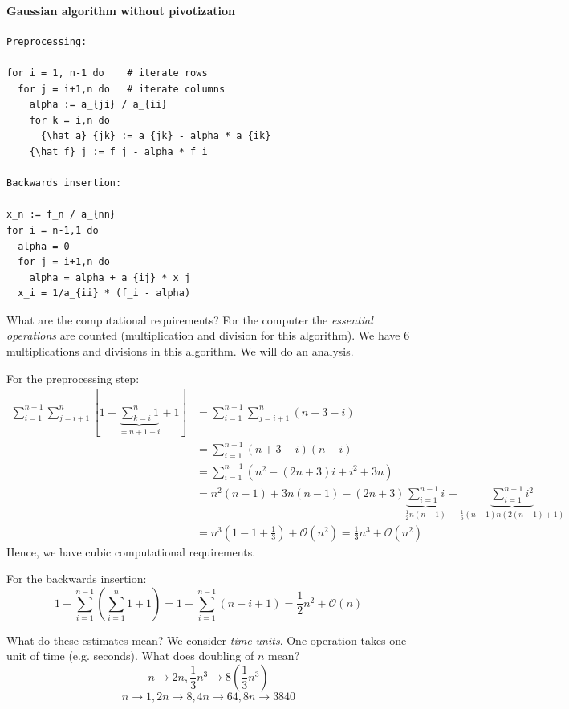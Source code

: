 \documentclass{article}
\begin{document}
\paragraph{Gaussian algorithm without pivotization}

\begin{verbatim}
Preprocessing:

for i = 1, n-1 do    # iterate rows
  for j = i+1,n do   # iterate columns
    alpha := a_{ji} / a_{ii}
    for k = i,n do
      {\hat a}_{jk} := a_{jk} - alpha * a_{ik}
    {\hat f}_j := f_j - alpha * f_i

Backwards insertion:

x_n := f_n / a_{nn}
for i = n-1,1 do
  alpha = 0
  for j = i+1,n do
    alpha = alpha + a_{ij} * x_j
  x_i = 1/a_{ii} * (f_i - alpha)
\end{verbatim}

What are the computational requirements?
For the computer the \emph{essential operations} are counted (multiplication and division for this algorithm).
We have 6 multiplications and divisions in this algorithm. We will do an analysis.

For the preprocessing step:
\begin{align*}
  \sum_{i=1}^{n-1} \sum_{j=i+1}^{n} \left[1 + \underbrace{\sum_{k=i}^n 1}_{= n + 1 - i} + 1\right]
   &= \sum_{i=1}^{n-1} \sum_{j=i+1}^n (n + 3 - i) \\
   &= \sum_{i=1}^{n-1} (n + 3 - i) (n - i) \\
   &= \sum_{i=1}^{n-1} (n^2 - (2n + 3) i + i^2 + 3n) \\
   &= n^2 (n-1) + 3n (n-1) - (2n + 3) \underbrace{\sum_{i=1}^{n-1} i}_{\frac12 n (n-1)} + \underbrace{\sum_{i=1}^{n-1} i^2}_{\frac16 (n - 1) n (2 (n-1) + 1)} \\
   &= n^3 (1 - 1 + \frac13) + \mathcal O(n^2) = \frac13 n^3 + \mathcal O(n^2)
\end{align*}
Hence, we have cubic computational requirements.

For the backwards insertion:
\[ 1 + \sum_{i=1}^{n-1} \left(\sum_{i=1}^n 1 + 1\right) = 1 + \sum_{i=1}^{n-1} (n - i + 1) = \frac12 n^2 + \mathcal O(n) \]

What do these estimates mean?
We consider \emph{time units}. One operation takes one unit of time (e.g. seconds).
What does doubling of $n$ mean?
\[ n \to 2n, \frac13 n^3 \to 8 \left(\frac13 n^3\right) \]
\[ n \to 1, 2n \to 8, 4n \to 64, 8n \to 3840 \]
\end{document}
